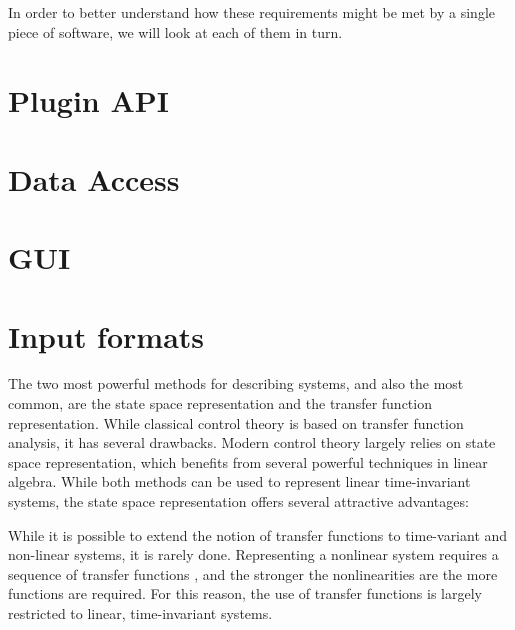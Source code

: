 \documentclass[\rootfolder/main.tex]{subfiles}
\begin{document}
In order to better understand how these requirements might be met by a single piece of software, we will look at each of them in turn.

\section{Plugin API}

\section{Data Access}

\section{GUI}

\section{Input formats}

The two most powerful methods for describing systems, and also the most common, are the state space representation and the transfer function representation.
While classical control theory is based on transfer function analysis, it has several drawbacks.
Modern control theory largely relies on state space representation, which benefits from several powerful techniques in linear algebra.
While both methods can be used to represent linear time-invariant systems, the state space representation offers several attractive advantages:

While it is possible to extend the notion of transfer functions to time-variant and non-linear systems, it is rarely done.
Representing a nonlinear system requires a sequence of transfer functions \cite{Zhang1993}, and the stronger the nonlinearities are the more functions are required.
For this reason, the use of transfer functions is largely restricted to linear, time-invariant systems.
\end{document}
